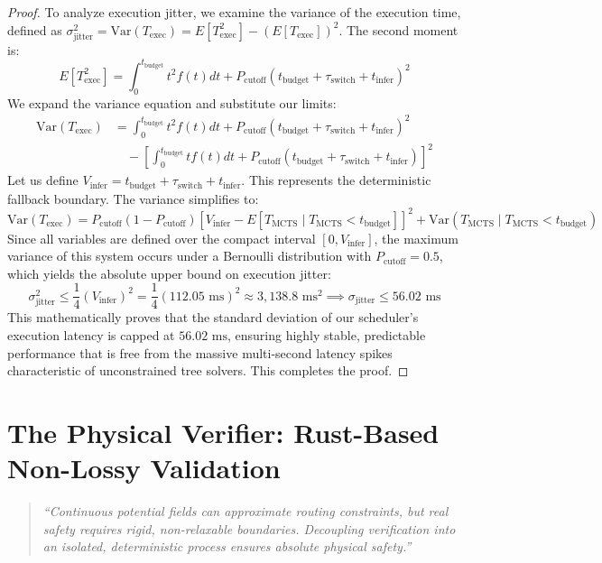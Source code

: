 \documentclass[11pt,a4paper]{book}
\begin{document}
\begin{proof}
To analyze execution jitter, we examine the variance of the execution time, defined as $\sigma^2_{\text{jitter}} = \text{Var}(T_{\text{exec}}) = E[T_{\text{exec}}^2] - (E[T_{\text{exec}}])^2$. The second moment is:
\begin{equation}
\label{eq:second_moment}
E[T_{\text{exec}}^2] = \int_{0}^{t_{\text{budget}}} t^2 f(t) dt + P_{\text{cutoff}} (t_{\text{budget}} + \tau_{\text{switch}} + t_{\text{infer}})^2
\end{equation}
We expand the variance equation and substitute our limits:
\begin{align}
\label{eq:variance_math}
\text{Var}(T_{\text{exec}}) &= \int_{0}^{t_{\text{budget}}} t^2 f(t) dt + P_{\text{cutoff}} (t_{\text{budget}} + \tau_{\text{switch}} + t_{\text{infer}})^2 \nonumber \\
&\quad - \left[ \int_{0}^{t_{\text{budget}}} t f(t) dt + P_{\text{cutoff}} (t_{\text{budget}} + \tau_{\text{switch}} + t_{\text{infer}}) \right]^2
\end{align}
Let us define $V_{\text{infer}} = t_{\text{budget}} + \tau_{\text{switch}} + t_{\text{infer}}$. This represents the deterministic fallback boundary. The variance simplifies to:
\begin{equation}
\label{eq:variance_simplified}
\text{Var}(T_{\text{exec}}) = P_{\text{cutoff}}(1 - P_{\text{cutoff}}) \left[ V_{\text{infer}} - E[T_{\text{MCTS}} \mid T_{\text{MCTS}} < t_{\text{budget}}] \right]^2 + \text{Var}(T_{\text{MCTS}} \mid T_{\text{MCTS}} < t_{\text{budget}})
\end{equation}
Since all variables are defined over the compact interval $[0, V_{\text{infer}}]$, the maximum variance of this system occurs under a Bernoulli distribution with $P_{\text{cutoff}} = 0.5$, which yields the absolute upper bound on execution jitter:
\begin{equation}
\label{eq:max_jitter}
\sigma^2_{\text{jitter}} \le \frac{1}{4} \left( V_{\text{infer}} \right)^2 = \frac{1}{4} (112.05\text{ ms})^2 \approx 3,138.8\text{ ms}^2 \implies \sigma_{\text{jitter}} \le 56.02\text{ ms}
\end{equation}
This mathematically proves that the standard deviation of our scheduler's execution latency is capped at $56.02\text{ ms}$, ensuring highly stable, predictable performance that is free from the massive multi-second latency spikes characteristic of unconstrained tree solvers. This completes the proof.
\end{proof}

\section{The Physical Verifier: Rust-Based Non-Lossy Validation}\label{sec:regulatory_compliance}
\begin{quote}
    \textit{``Continuous potential fields can approximate routing constraints, but real safety requires rigid, non-relaxable boundaries. Decoupling verification into an isolated, deterministic process ensures absolute physical safety.''}
\end{quote}
\end{document}
